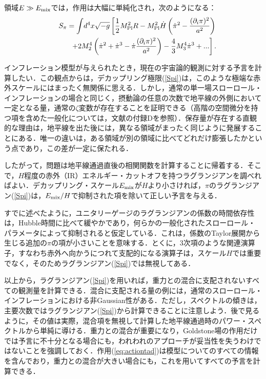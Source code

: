 領域$E\gg E_{\rm mix}$では，作用は大幅に単純化され，次のようになる：
\begin{eqnarray}\label{Spi} 
&&\! \! S_{\rm \pi} = \int \!  d^4 x   \sqrt{- g} \left[\frac12 M_{\rm Pl}^2 R -M^2_{\rm Pl}
\dot{H} \left(\dot\pi^2-\frac{ (\partial_i \pi)^2}{a^2}\right)
\right.\nonumber \\ &&\qquad\left.+2 M^4_2
\left(\dot\pi^2+\dot{\pi}^3-\dot\pi\frac{(\partial_i\pi)^2}{a^2}
\right) -\frac{4}{3} M^4_3 \dot{\pi}^3+ ... \right].
\end{eqnarray}

インフレーション模型が与えられたとき，現在の宇宙論的観測に対する予言を計算したい．この観点からは，デカップリング極限(\ref{Spi})は，このような極端な赤外スケールにはまったく無関係に思える．しかし，通常の単一場スローロール・インフレーションの場合と同じく，摂動論の任意の次数で地平線の外側において一定となる量，通常の$\zeta$変数が存在することを証明できる\cite{Salopek:1990jq,Lyth:2004gb}（高階の空間微分を持つ項を含めた一般化については，文献\cite{Cheung:2007sv}の付録Dを参照）．保存量が存在する直観的な理由は，地平線を出た後には，異なる領域がまったく同じように発展することにある．唯一の違いは，ある領域が別の領域に比べてどれだけ膨張したかという点であり，この差が一定に保たれる．

したがって，問題は地平線通過直後の相関関数を計算することに帰着する．そこで，$H$程度の赤外（IR）エネルギー・カットオフを持つラグランジアンを調べればよい．デカップリング・スケール$E_{\rm mix}$が$H$より小さければ，$\pi$のラグランジアン(\ref{Spi})は，$E_{\rm mix}/H$で抑制された項を除いて正しい予言を与える．

すでに述べたように，ユニタリーゲージのラグランジアンの係数の時間依存性は，Hubble時間に比べて緩やかであり，何らかの一般化されたスローロール・パラメータによって抑制されると仮定している．これは，係数のTaylor展開から生じる追加の$\pi$の項が小さいことを意味する．とくに，3次項のような関連演算子，すなわち赤外へ向かうにつれて支配的になる演算子は，スケール$H$では重要でなく，そのためラグランジアン(\ref{Spi})では無視してある．

以上から，ラグランジアン(\ref{Spi})を用いれば，重力との混合に支配されないすべての観測量を計算できる．混合に支配される量の例には，通常のスローロール・インフレーションにおける非Gaussian性がある\cite{Maldacena:2002vr,Seery:2006vu}．ただし，スペクトルの傾きは，主要次数ではラグランジアン(\ref{Spi})から計算できることに注意しよう．後で見るように，その値は実際，混合項を無視して計算した地平線通過時のパワー・スペクトルから単純に導ける．重力との混合が重要になり，Goldstone場の作用だけでは予言に不十分となる場合にも，われわれのアプローチが妥当性を失うわけではないことを強調しておく．作用(\ref{eq:actiontad})は模型についてのすべての情報を含んでおり，重力との混合が大きい場合にも，これを用いてすべての予言を計算できる．

